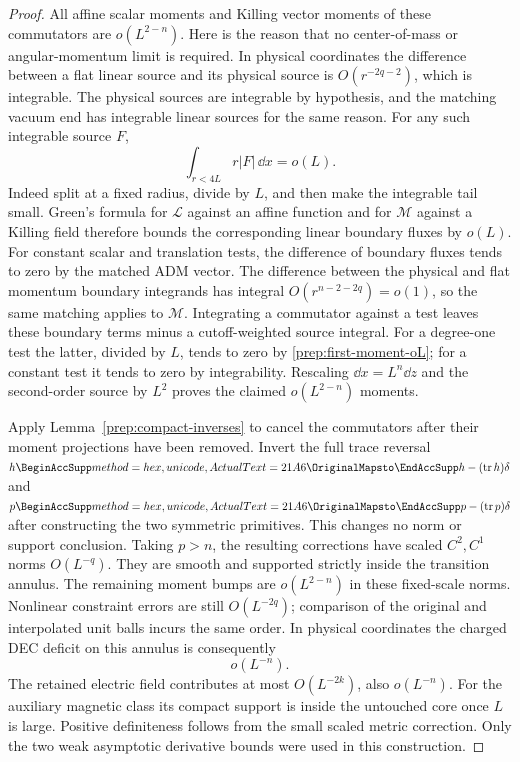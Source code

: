 \begin{proof}
All affine scalar moments and Killing vector moments of these
commutators are $o(L^{2-n})$.  Here is the reason that no center-of-mass
or angular-momentum limit is required.  In physical coordinates the
difference between a flat linear source and its physical source is
$O(r^{-2q-2})$, which is integrable.  The physical sources are
integrable by hypothesis, and the matching vacuum end has integrable
linear sources for the same reason.  For any such integrable source
$F$,
\begin{equation}
 \label{prep:first-moment-oL}
 \int_{r<4L}r|F|\,\dd x=o(L).
\end{equation}
Indeed split at a fixed radius, divide by $L$, and then make the
integrable tail small.  Green's formula for $\mathcal L$ against an
affine function and for $\mathcal M$ against a Killing field therefore
bounds the corresponding linear boundary fluxes by $o(L)$.
For constant scalar and translation tests, the difference of boundary
fluxes tends to zero by the matched ADM vector.  The difference between
the physical and flat momentum boundary integrands has integral
$O(r^{n-2-2q})=o(1)$, so the same matching applies to $\mathcal M$.
Integrating a commutator against a test leaves these boundary terms
minus a cutoff-weighted source integral.  For a degree-one test the
latter, divided by $L$, tends to zero by
\eqref{prep:first-moment-oL}; for a constant test it tends to zero by
integrability.  Rescaling $\dd x=L^n\dd z$ and the second-order source
by $L^2$ proves the claimed $o(L^{2-n})$ moments.

Apply Lemma~\ref{prep:compact-inverses} to cancel the commutators after
their moment projections have been removed.  Invert the full trace
reversal $h\mapsto h-(\tr h)\delta$ and
$p\mapsto p-(\tr p)\delta$ after constructing the two symmetric
primitives.  This changes no norm or support conclusion.  Taking
$p>n$, the resulting corrections have scaled $C^2,C^1$ norms
$O(L^{-q})$.  They are smooth and supported strictly inside the
transition annulus.  The remaining moment bumps are
$o(L^{2-n})$ in these fixed-scale norms.  Nonlinear constraint errors
are still $O(L^{-2q})$; comparison of the original and interpolated
unit balls incurs the same order.  In physical coordinates the charged
DEC deficit on this annulus is consequently
\begin{equation}
 \label{prep:annular-deficit}
 o(L^{-n}).
\end{equation}
The retained electric field contributes at most $O(L^{-2k})$, also
$o(L^{-n})$.  For the auxiliary magnetic class its compact support is
inside the untouched core once $L$ is large.  Positive definiteness
follows from the small scaled metric correction.  Only the two weak
asymptotic derivative bounds were used in this construction.


\end{proof}
